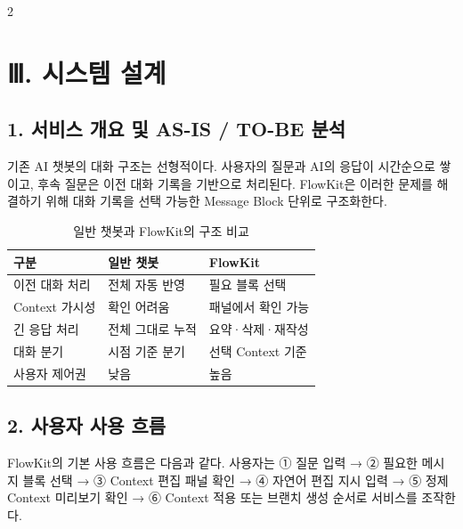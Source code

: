 \documentclass[10pt, a4paper]{article}
\begin{document}
\begin{multicols}{2}
\section*{Ⅲ. 시스템 설계}

\subsection*{1. 서비스 개요 및 AS-IS / TO-BE 분석}

기존 AI 챗봇의 대화 구조는 선형적이다. 사용자의 질문과 AI의 응답이 시간순으로 쌓이고, 후속 질문은 이전 대화 기록을 기반으로 처리된다. FlowKit은 이러한 문제를 해결하기 위해 대화 기록을 선택 가능한 Message Block 단위로 구조화한다.

\begin{table}[H]
\centering
\caption{일반 챗봇과 FlowKit의 구조 비교}
\label{tab:comparison}
\small
\begin{tabularx}{\columnwidth}{@{} l X X @{}}
\toprule
\textbf{구분} & \textbf{일반 챗봇} & \textbf{FlowKit} \\
\midrule
이전 대화 처리    & 전체 자동 반영    & 필요 블록 선택      \\
Context 가시성 & 확인 어려움      & 패널에서 확인 가능   \\
긴 응답 처리     & 전체 그대로 누적   & 요약·삭제·재작성   \\
대화 분기       & 시점 기준 분기    & 선택 Context 기준  \\
사용자 제어권     & 낮음           & 높음             \\
\bottomrule
\end{tabularx}
\end{table}

\subsection*{2. 사용자 사용 흐름}

FlowKit의 기본 사용 흐름은 다음과 같다. 사용자는 ① 질문 입력 → ② 필요한 메시지 블록 선택 → ③ Context 편집 패널 확인 → ④ 자연어 편집 지시 입력 → ⑤ 정제 Context 미리보기 확인 → ⑥ Context 적용 또는 브랜치 생성 순서로 서비스를 조작한다.


\end{multicols}
\end{document}
